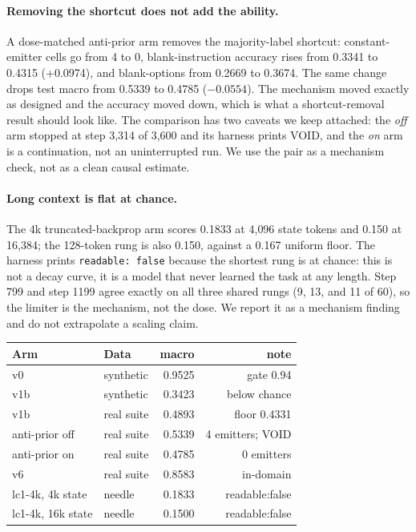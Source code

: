 \paragraph{Removing the shortcut does not add the ability.}
A dose-matched anti-prior arm removes the majority-label shortcut: constant-emitter cells go from 4 to 0, blank-instruction accuracy rises from 0.3341 to 0.4315 (+0.0974), and blank-options from 0.2669 to 0.3674. The same change drops test macro from 0.5339 to 0.4785 ($-0.0554$). The mechanism moved exactly as designed and the accuracy moved down, which is what a shortcut-removal result should look like. The comparison has two caveats we keep attached: the \emph{off} arm stopped at step 3{,}314 of 3{,}600 and its harness prints VOID, and the \emph{on} arm is a continuation, not an uninterrupted run. We use the pair as a mechanism check, not as a clean causal estimate.

\paragraph{Long context is flat at chance.}
The 4k truncated-backprop arm scores 0.1833 at 4{,}096 state tokens and 0.150 at 16{,}384; the 128-token rung is also 0.150, against a 0.167 uniform floor. The harness prints \texttt{readable: false} because the shortest rung is at chance: this is not a decay curve, it is a model that never learned the task at any length. Step 799 and step 1199 agree exactly on all three shared rungs (9, 13, and 11 of 60), so the limiter is the mechanism, not the dose. We report it as a mechanism finding and do not extrapolate a scaling claim.

\begin{widetable}
\centering
\footnotesize
\caption{The small-engine diagnostics. Synthetic and real columns are different suites: 0.9525 is the synthetic test split; 0.4893--0.5339 are the real 16-cell suite. The anti-prior \emph{off} arm stopped at step 3{,}314 of 3{,}600 and its harness prints VOID.}
\label{tab:diagnostics}
\begin{tabular}{llrr}
\toprule
Arm & Data & macro & note \\
\midrule
v0 & synthetic & 0.9525 & gate 0.94 \\
v1b & synthetic & 0.3423 & below chance \\
v1b & real suite & 0.4893 & floor 0.4331 \\
anti-prior off & real suite & 0.5339 & 4 emitters; VOID \\
anti-prior on & real suite & 0.4785 & 0 emitters \\
v6 & real suite & 0.8583 & in-domain \\
lc1-4k, 4k state & needle & 0.1833 & readable:false \\
lc1-4k, 16k state & needle & 0.1500 & readable:false \\
\bottomrule
\end{tabular}
\end{widetable}



